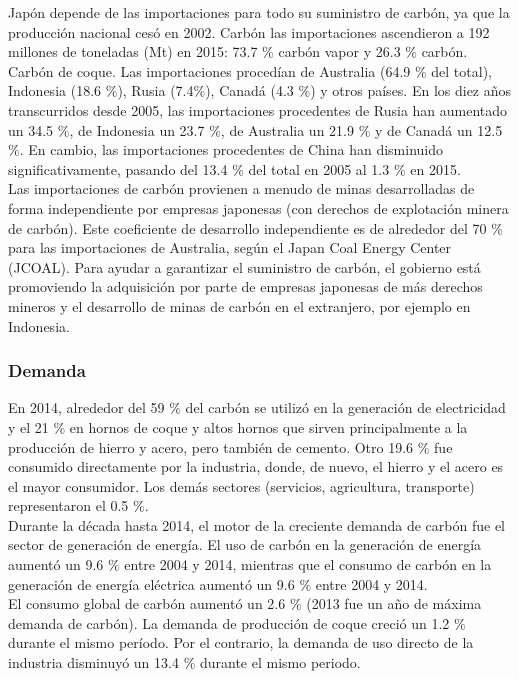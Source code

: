 \documentclass[]{article}
\begin{document}
Japón depende de las importaciones para todo su suministro de carbón, ya que la producción nacional cesó en 2002. Carbón
las importaciones ascendieron a 192 millones de toneladas (Mt) en 2015: 73.7 $\%$ carbón vapor y 26.3 $\%$ carbón.\\

Carbón de coque. Las importaciones procedían de Australia (64.9 $\%$ del total), Indonesia (18.6 $\%$), Rusia (7.4$\%$), Canadá (4.3 $\%$) y otros países. En los diez años transcurridos desde 2005, las importaciones procedentes de Rusia han aumentado un 34.5 $\%$, de Indonesia un 23.7 $\%$, de Australia un 21.9 $\%$ y de Canadá un 12.5 $\%$. En cambio, las importaciones procedentes de China han disminuido significativamente, pasando del 13.4 $\%$ del total en 2005 al 1.3 $\%$ en 2015.\\

Las importaciones de carbón provienen a menudo de minas desarrolladas de forma independiente por empresas japonesas (con derechos de explotación minera de carbón). Este coeficiente de desarrollo independiente es de alrededor del 70 $\%$ para las importaciones de Australia, según el Japan Coal Energy Center (JCOAL). Para ayudar a garantizar el suministro de carbón, el gobierno está promoviendo la adquisición por parte de empresas japonesas de más derechos mineros y el desarrollo de minas de carbón en el extranjero, por ejemplo en Indonesia.\\

\subsubsection{Demanda}

En 2014, alrededor del 59 $\%$ del carbón se utilizó en la generación de electricidad y el 21 $\%$ en hornos de coque y altos hornos que sirven principalmente a la producción de hierro y acero, pero también de cemento. Otro 19.6 $\%$ fue consumido directamente por la industria, donde, de nuevo, el hierro y el acero es el mayor consumidor. Los demás sectores (servicios, agricultura, transporte) representaron el 0.5 $\%$.\\

Durante la década hasta 2014, el motor de la creciente demanda de carbón fue el sector de generación de energía. El uso de carbón en la generación de energía aumentó un 9.6 $\%$ entre 2004 y 2014, mientras que el consumo de carbón en la generación de energía eléctrica aumentó un 9.6 $\%$ entre 2004 y 2014.\\
El consumo global de carbón aumentó un 2.6 $\%$ (2013 fue un año de máxima demanda de carbón). La demanda de producción de coque creció un 1.2 $\%$ durante el mismo período. Por el contrario, la demanda de uso directo de la industria disminuyó un 13.4 $\%$ durante el mismo periodo.\citep{InternationalEnergyAgency2016}\\
\end{document}
